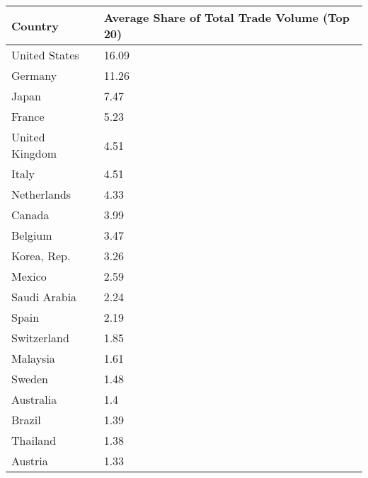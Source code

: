\begin{table}[tbp] \centering
{}

\begin{tabularx}{\linewidth}{lC}

\toprule
{Country}&{Average Share of Total Trade Volume (Top 20)} \tabularnewline
\midrule \addlinespace[\belowrulesep]
United States&16.09 \tabularnewline
Germany&11.26 \tabularnewline
Japan&7.47 \tabularnewline
France&5.23 \tabularnewline
United Kingdom&4.51 \tabularnewline
Italy&4.51 \tabularnewline
Netherlands&4.33 \tabularnewline
Canada&3.99 \tabularnewline
Belgium&3.47 \tabularnewline
Korea, Rep.&3.26 \tabularnewline
Mexico&2.59 \tabularnewline
Saudi Arabia&2.24 \tabularnewline
Spain&2.19 \tabularnewline
Switzerland&1.85 \tabularnewline
Malaysia&1.61 \tabularnewline
Sweden&1.48 \tabularnewline
Australia&1.4 \tabularnewline
Brazil&1.39 \tabularnewline
Thailand&1.38 \tabularnewline
Austria&1.33 \tabularnewline
\bottomrule 

\end{tabularx}
\end{table}
